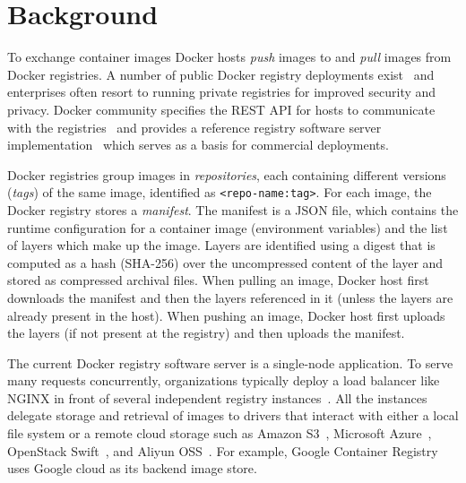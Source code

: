 \section{Background}
\label{sec:background}


%
%

To exchange container images Docker hosts \emph{push} images to and \emph{pull}
images from Docker registries.
%
A number of public Docker registry deployments
exist~\cite{docker-hub,amazon-ecr,jfrog-artifactory,azure-cr,google-cr} and
enterprises often resort to running private registries for improved security
and privacy.
%
Docker community specifies the REST API for hosts to communicate with the
registries~\cite{docker-registry-api} and provides a reference registry
software server implementation~\cite{docker-registry-software} which serves as
a basis for commercial deployments.





Docker registries group images in \emph{repositories}, each containing
different versions (\emph{tags}) of the same image, identified as
\texttt{<repo-name:tag>}.
%
For each image, the Docker registry stores a \emph{manifest}.
%
The manifest is a JSON file, which contains the runtime configuration for a
container image (\eg environment variables) and the list of layers which make
up the image.
%
Layers are identified using a digest that is computed as a hash (SHA-256) over
the uncompressed content of the layer and stored as compressed archival files.
%
When pulling an image, Docker host first downloads the manifest and then the
layers referenced in it (unless the layers are already present in the host).
%
When pushing an image, Docker host first uploads the layers (if not present at the
registry) and then uploads the manifest.





The current Docker registry software server is a single-node application.
%
To serve many requests concurrently, organizations typically deploy a load
balancer like NGINX in front of several independent registry
instances~\cite{dockerworkload, anwar-cloud19}.
%
All the instances delegate storage and retrieval of images to drivers that interact with
either a local file system or a remote cloud storage such as Amazon
S3~\cite{s3}, Microsoft Azure~\cite{azure}, OpenStack Swift~\cite{swift}, and
Aliyun OSS~\cite{aliyun}.
%
For example, Google Container Registry~\cite{GoogleContainerRegistry} uses
Google cloud as its backend image store. 




